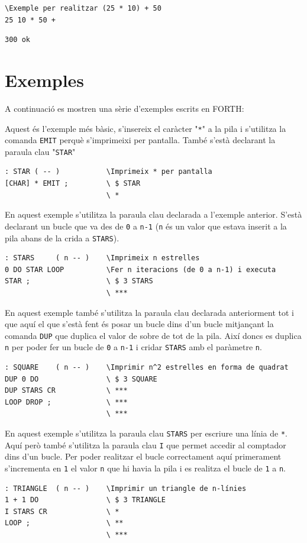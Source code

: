 \documentclass{article}
\begin{document}
\begin{lstlisting}[frame=single]
\Exemple per realitzar (25 * 10) + 50
25 10 * 50 +
\end{lstlisting}
\begin{lstlisting}[frame=single,language=TeX]
300 ok
\end{lstlisting}

\section{Exemples}
A continuació es mostren una sèrie d'exemples escrits en FORTH\cite{rosettacode}:

Aquest és l'exemple més bàsic, s'insereix el caràcter "\texttt{*}" a la pila i s'utilitza la comanda \texttt{EMIT} perquè s'imprimeixi per pantalla. També s'està declarant la paraula clau "\texttt{STAR}"
\begin{lstlisting}[frame=single]
: STAR ( -- )           \Imprimeix * per pantalla          
[CHAR] * EMIT ;       	\ $ STAR
						\ *
\end{lstlisting}

En aquest exemple s'utilitza la paraula clau declarada a l'exemple anterior. S'està declarant un bucle que va des de \texttt{0} a \texttt{n-1} (\texttt{n} és un valor que estava inserit a la pila abans de la crida a \texttt{STARS}).
\begin{lstlisting}[frame=single]
: STARS     ( n -- )    \Imprimeix n estrelles
0 DO STAR LOOP        	\Fer n iteracions (de 0 a n-1) i executa
STAR ;                	\ $ 3 STARS
						\ ***
\end{lstlisting}

En aquest exemple també s'utilitza la paraula clau declarada anteriorment tot i que aquí el que s'està fent és posar un bucle dins d'un bucle mitjançant la comanda \texttt{DUP} que duplica el valor de sobre de tot de la pila. Així doncs es duplica \texttt{n} per poder fer un bucle de \texttt{0} a \texttt{n-1} i cridar \texttt{STARS} amb el paràmetre \texttt{n}.
\begin{lstlisting}[frame=single]
: SQUARE    ( n -- )    \Imprimir n^2 estrelles en forma de quadrat
DUP 0 DO              	\ $ 3 SQUARE
DUP STARS CR          	\ ***
LOOP DROP ;           	\ ***
						\ ***
\end{lstlisting}

En aquest exemple s'utilitza la paraula clau \texttt{STARS} per escriure una línia de \texttt{*}. Aquí però també s'utilitza la paraula clau \texttt{I} que permet accedir al comptador dins d'un bucle. Per poder realitzar el bucle correctament aquí primerament s'incrementa en \texttt{1} el valor \texttt{n} que hi havia la pila i es realitza el bucle de \texttt{1} a \texttt{n}.
\begin{lstlisting}[frame=single]
: TRIANGLE  ( n -- )    \Imprimir un triangle de n-línies
1 + 1 DO              	\ $ 3 TRIANGLE
I STARS CR            	\ *
LOOP ;                	\ **
						\ ***
\end{lstlisting}
\end{document}
